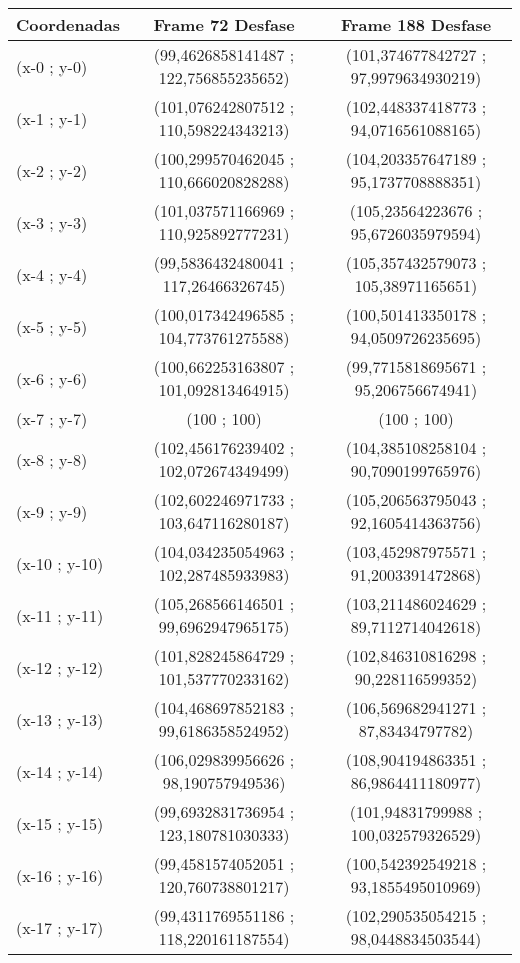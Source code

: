 \begin{table}[htbp]
	\centering
	\begin{tabular}{|l|c|c|}
		\hline
		Coordenadas & Frame 72 Desfase & Frame 188 Desfase \\ \hline
		(x-0 ; y-0) & (99,4626858141487 ; 122,756855235652) & (101,374677842727 ; 97,9979634930219) \\
		(x-1 ; y-1) & (101,076242807512 ; 110,598224343213) & (102,448337418773 ; 94,0716561088165) \\
		(x-2 ; y-2) & (100,299570462045 ; 110,666020828288) & (104,203357647189 ; 95,1737708888351) \\
		(x-3 ; y-3) & (101,037571166969 ; 110,925892777231) & (105,23564223676 ; 95,6726035979594) \\
		(x-4 ; y-4) & (99,5836432480041 ; 117,26466326745) & (105,357432579073 ; 105,38971165651) \\
		(x-5 ; y-5) & (100,017342496585 ; 104,773761275588) & (100,501413350178 ; 94,0509726235695) \\
		(x-6 ; y-6) & (100,662253163807 ; 101,092813464915) & (99,7715818695671 ; 95,206756674941) \\
		(x-7 ; y-7) & (100 ; 100) & (100 ; 100) \\
		(x-8 ; y-8) & (102,456176239402 ; 102,072674349499) & (104,385108258104 ; 90,7090199765976) \\
		(x-9 ; y-9) & (102,602246971733 ; 103,647116280187) & (105,206563795043 ; 92,1605414363756) \\
		(x-10 ; y-10) & (104,034235054963 ; 102,287485933983) & (103,452987975571 ; 91,2003391472868) \\
		(x-11 ; y-11) & (105,268566146501 ; 99,6962947965175) & (103,211486024629 ; 89,7112714042618) \\
		(x-12 ; y-12) & (101,828245864729 ; 101,537770233162) & (102,846310816298 ; 90,228116599352) \\
		(x-13 ; y-13) & (104,468697852183 ; 99,6186358524952) & (106,569682941271 ; 87,83434797782) \\
		(x-14 ; y-14) & (106,029839956626 ; 98,190757949536) & (108,904194863351 ; 86,9864411180977) \\
		(x-15 ; y-15) & (99,6932831736954 ; 123,180781030333) & (101,94831799988 ; 100,032579326529) \\
		(x-16 ; y-16) & (99,4581574052051 ; 120,760738801217) & (100,542392549218 ; 93,1855495010969) \\
		(x-17 ; y-17) & (99,4311769551186 ; 118,220161187554) & (102,290535054215 ; 98,0448834503544) \\

\end{tabular}
\end{table}
